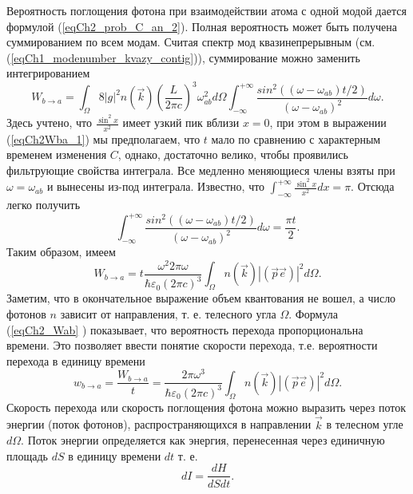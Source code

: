 Вероятность поглощения фотона при взаимодействии атома с одной модой
дается формулой (\ref{eqCh2_prob_C_an_2}). Полная вероятность может
быть получена суммированием по всем модам. Считая спектр мод
квазинепрерывным (см. (\ref{eqCh1_modenumber_kvazy_contig})),
суммирование можно заменить интегрированием
\begin{equation}
W_{b \rightarrow a} = \int_{\Omega} 8 \left|g\right|^2 n(\vec{k})
\left(\frac{L}{2 \pi c}\right)^3 \omega_{ab}^2 d \Omega 
\int_{-\infty}^{+\infty} 
\frac{sin^2\left(\left(\omega - 
  \omega_{ab}\right)t/2\right)} {\left(\omega - 
  \omega_{ab}\right)^2} d \omega.
\label{eqCh2Wba_1}
\end{equation}
Здесь учтено, что $\frac{\sin^2 x}{x^2}$   имеет узкий пик вблизи $x =
0$, при этом в выражении (\ref{eqCh2Wba_1}) мы предполагаем, что $t$ мало по
сравнению с характерным временем изменения $C$, однако, достаточно
велико, чтобы проявились фильтрующие свойства интеграла.
Все
медленно меняющиеся члены взяты при $\omega = \omega_{ab}$ и вынесены
из-под интеграла. Известно, что $\int_{-\infty}^{+\infty} \frac{\sin^2
x}{x^2} dx = \pi$.  Отсюда легко получить  
\[
\int_{-\infty}^{+\infty} \frac{sin^2\left(\left(\omega - 
  \omega_{ab}\right)t/2\right)} {\left(\omega - 
  \omega_{ab}\right)^2} d \omega = \frac{\pi t }{2}.
\]
Таким образом, имеем   
\begin{equation}
W_{b \rightarrow a} = t \frac{\omega^2 2 \pi \omega}
{\hbar \varepsilon_0 \left(2 \pi c\right)^3}\int_{\Omega} 
n(\vec{k})\left|\left(\vec{p} \vec{e}\right)\right|^2
d \Omega.
\label{eqCh2_Wab} 
\end{equation}
Заметим, что в окончательное выражение объем квантования не
вошел, а число фотонов $n$ зависит от направления, т. е. телесного
угла $\Omega$. Формула (\ref{eqCh2_Wab} ) показывает, что вероятность перехода 
пропорциональна времени. Это позволяет ввести понятие скорости
перехода, т.е. вероятности перехода в единицу времени 
\begin{equation}
w_{b \rightarrow a} = \frac{W_{b \rightarrow a}}{t} = \frac{2 \pi
  \omega^3 }  
{\hbar \varepsilon_0 \left(2 \pi c\right)^3}\int_{\Omega} 
n(\vec{k}) \left|\left(\vec{p} \vec{e}\right)\right|^2
d \Omega.
\label{eqCh2_wab} 
\end{equation}
Скорость перехода или скорость поглощения фотона можно выразить
\cite{bLuisell1972} через поток энергии (поток фотонов),
распространяющихся в направлении $\vec{k}$ в  
телесном угле $d \Omega$.  Поток энергии определяется как энергия,
перенесенная через единичную площадь $dS$ в единицу времени $dt$ т. е.
\[
d I = \frac{dH}{dS dt}.
\]


